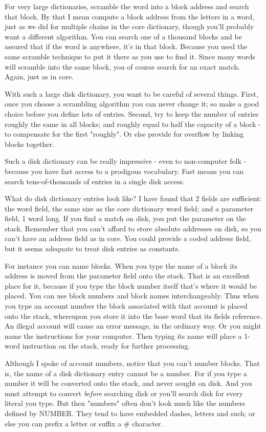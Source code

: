 \documentclass[b5paper, oneside]{book}
\begin{document}
For very large dictionaries, scramble the word into a block address and search that block. By that I mean compute a block address from the letters in a word, just as we did for multiple chains in the core dictionary, though you'll probably want a different algorithm. You can search one of a thousand blocks and be assured that if the word is anywhere, it's in that block. Because you used the same scramble technique to put it there as you use to find it. Since many words will scramble into the same block, you of course search for an exact match. Again, just as in core.

With such a large disk dictionary, you want to be careful of several things. First, once you choose a scrambling algorithm you can never change it; so make a good choice before you define lots of entries. Second, try to keep the number of entries roughly the same in all blocks; and roughly equal to half the capacity of a block - to compensate for the first "roughly". Or else provide for overflow by linking blocks together.

Such a disk dictionary can be really impressive - even to non-computer folk - because you have fast access to a prodigous vocabulary. Fast means you can search tens-of-thousands of entries in a single disk access.

What do disk dictionary entries look like? I have found that 2 fields are sufficient: the word field, the same size as the core dictionary word field; and a parameter field, 1 word long. If you find a match on disk, you put the parameter on the stack. Remember that you can't afford to store absolute addresses on disk, so you can't have an address field as in core. You could provide a coded address field, but it seems adequate to treat disk entries as constants.

For instance you can name blocks. When you type the name of a block its address is moved from the parameter field onto the stack. That is an excellent place for it, because if you type the block number itself that's where it would be placed. You can use block numbers and block names interchangeably. Thus when you type an account number the block associated with that account is placed onto the stack, whereupon you store it into the base word that its fields reference. An illegal account will cause an error message, in the ordinary way. Or you might name the instructions for your computer. Then typing its name will place a 1-word instruction on the stack, ready for further processing.

Although I spoke of account numbers, notice that you can't number blocks. That is, the name of a disk dictionary entry cannot be a number. For if you type a number it will be converted onto the stack, and never sought on disk. And you must attempt to convert {\em before} searching disk or you'll search disk for every literal you type. But then "numbers" often don't look much like the numbers defined by NUMBER. They tend to have embedded dashes, letters and such; or else you can prefix a letter or suffix a \# character.
\end{document}
